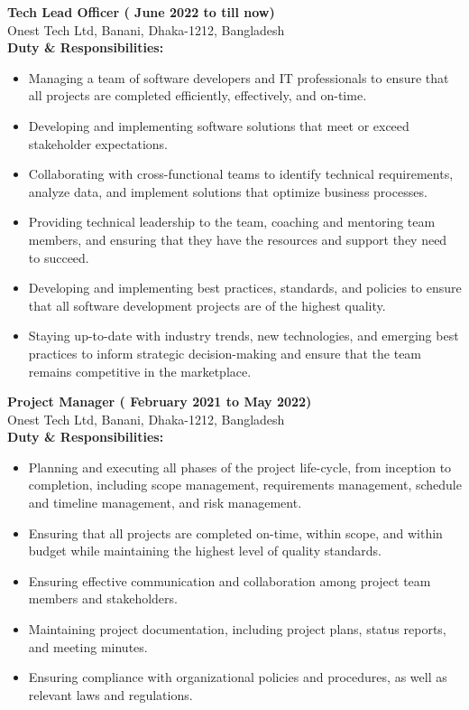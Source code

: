 \documentclass[10pt]{res}
\begin{document}
\begin{resume}
\vspace{20pt}
\textbf{Tech Lead Officer ( June 2022 to till now)}\\
Onest Tech Ltd, Banani, Dhaka-1212, Bangladesh\\
\vspace{6px}  
\textbf{Duty \& Responsibilities:}
    \begin{itemize}
        \item Managing a team of software developers and IT professionals to ensure that all projects are completed efficiently, effectively, and on-time.
        \item Developing and implementing software solutions that meet or exceed stakeholder expectations.
        \item Collaborating with cross-functional teams to identify technical requirements, analyze data, and implement solutions that optimize business processes.
        \item Providing technical leadership to the team, coaching and mentoring team members, and ensuring that they have the resources and support they need to succeed.
        \item Developing and implementing best practices, standards, and policies to ensure that all software development projects are of the highest quality.
        \item Staying up-to-date with industry trends, new technologies, and emerging best practices to inform strategic decision-making and ensure that the team remains competitive in the marketplace.
    \end{itemize}  

  
\vspace{20pt}
\textbf{Project Manager ( February 2021 to May 2022)}\\
Onest Tech Ltd, Banani, Dhaka-1212, Bangladesh\\
\vspace{6px}  
\textbf{Duty \& Responsibilities:}
    \begin{itemize}
        \item Planning and executing all phases of the project life-cycle, from inception to completion, including scope management, requirements management, schedule and timeline management, and risk management.
        \item Ensuring that all projects are completed on-time, within scope, and within budget while maintaining the highest level of quality standards.
        \item Ensuring effective communication and collaboration among project team members and stakeholders.
        \item Maintaining project documentation, including project plans, status reports, and meeting minutes.
        \item Ensuring compliance with organizational policies and procedures, as well as relevant laws and regulations.
    \end{itemize} 



\end{resume}
\end{document}
